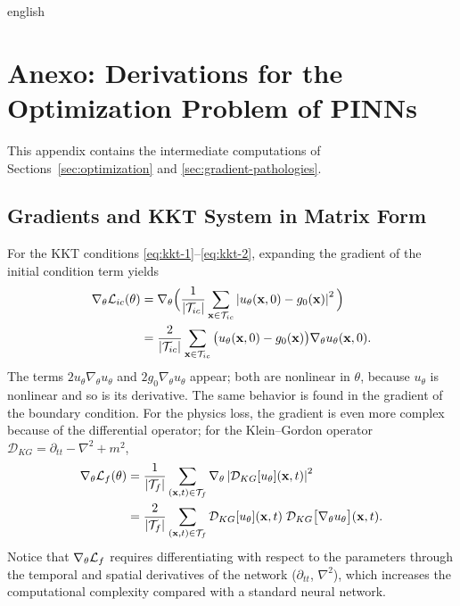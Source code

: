 
\begin{hyphenrules}{english}

\chapter{Anexo: Derivations for the Optimization Problem of PINNs}\label{app:optimization}

This appendix contains the intermediate computations of Sections~\ref{sec:optimization} and
\ref{sec:gradient-pathologies}.

\section{Gradients and KKT System in Matrix Form}\label{app-sec:kkt-gradients}

For the KKT conditions \eqref{eq:kkt-1}--\eqref{eq:kkt-2}, expanding the gradient of the initial
condition term yields
\begin{align}
  \nabla_\theta\mathcal{L}_{ic}(\theta)
  &=\nabla_\theta\Big(\frac{1}{\left\lvert \mathcal{T}_{ic} \right\rvert}\sum_{\mathbf{x}\in\mathcal{T}_{ic}}\left\lvert u_\theta(\mathbf{x},0)-g_0(\mathbf{x}) \right\rvert^2\Big) \label{eq:grad-ic-1}\\
  &=\frac{2}{\left\lvert \mathcal{T}_{ic} \right\rvert}\sum_{\mathbf{x}\in\mathcal{T}_{ic}}\big(u_\theta(\mathbf{x},0)-g_0(\mathbf{x})\big)\nabla_\theta u_\theta(\mathbf{x},0). \label{eq:grad-ic-2}
\end{align}
The terms $2u_\theta\nabla_\theta u_\theta$ and $2g_0\nabla_\theta u_\theta$ appear; both are nonlinear in
$\theta$, because $u_\theta$ is nonlinear and so is its derivative. The same behavior is found in the
gradient of the boundary condition. For the physics loss, the gradient is even more complex because of
the differential operator; for the Klein--Gordon operator
$\mathcal{D}_{KG}=\partial_{tt}-\nabla^2+m^2$,
\begin{align}
  \nabla_\theta\mathcal{L}_f(\theta)
  &=\frac{1}{\left\lvert \mathcal{T}_f \right\rvert}\sum_{(\mathbf{x},t)\in\mathcal{T}_f}\nabla_\theta\left\lvert \mathcal{D}_{KG}[u_\theta](\mathbf{x},t) \right\rvert^2 \label{eq:grad-f-1}\\
  &=\frac{2}{\left\lvert \mathcal{T}_f \right\rvert}\sum_{(\mathbf{x},t)\in\mathcal{T}_f}\mathcal{D}_{KG}[u_\theta](\mathbf{x},t)\;
    \mathcal{D}_{KG}\big[\nabla_\theta u_\theta\big](\mathbf{x},t). \label{eq:grad-f-2}
\end{align}
Notice that $\nabla_\theta\mathcal{L}_f$ requires differentiating with respect to the parameters through the
temporal and spatial derivatives of the network ($\partial_{tt}$, $\nabla^2$), which increases the
computational complexity compared with a standard neural network.


\end{hyphenrules}

